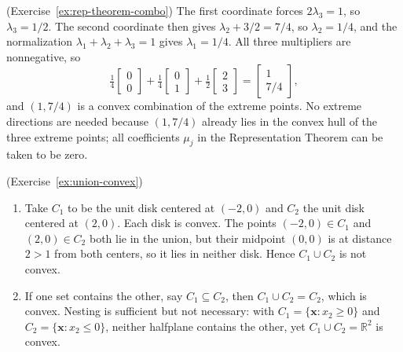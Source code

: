 \begin{solution}(Exercise~\ref{ex:rep-theorem-combo})
The first coordinate forces \( 2\lambda_3 = 1 \), so \( \lambda_3 = 1/2 \). The second coordinate then gives \( \lambda_2 + 3/2 = 7/4 \), so \( \lambda_2 = 1/4 \), and the normalization \( \lambda_1 + \lambda_2 + \lambda_3 = 1 \) gives \( \lambda_1 = 1/4 \). All three multipliers are nonnegative, so
\[
\tfrac{1}{4} \begin{bmatrix} 0 \\ 0 \end{bmatrix} + \tfrac{1}{4} \begin{bmatrix} 0 \\ 1 \end{bmatrix} + \tfrac{1}{2} \begin{bmatrix} 2 \\ 3 \end{bmatrix} = \begin{bmatrix} 1 \\ 7/4 \end{bmatrix},
\]
and \( (1, 7/4) \) is a convex combination of the extreme points. No extreme directions are needed because \( (1, 7/4) \) already lies in the convex hull of the three extreme points; all coefficients \( \mu_j \) in the Representation Theorem can be taken to be zero.
\end{solution}

\begin{solution}(Exercise~\ref{ex:union-convex})
\begin{enumerate}
    \item Take \( C_1 \) to be the unit disk centered at \( (-2,0) \) and \( C_2 \) the unit disk centered at \( (2,0) \). Each disk is convex. The points \( (-2,0) \in C_1 \) and \( (2,0) \in C_2 \) both lie in the union, but their midpoint \( (0,0) \) is at distance \( 2 > 1 \) from both centers, so it lies in neither disk. Hence \( C_1 \cup C_2 \) is not convex.
    \item If one set contains the other, say \( C_1 \subseteq C_2 \), then \( C_1 \cup C_2 = C_2 \), which is convex. Nesting is sufficient but not necessary: with \( C_1 = \{ \mathbf{x} : x_2 \geq 0 \} \) and \( C_2 = \{ \mathbf{x} : x_2 \leq 0 \} \), neither halfplane contains the other, yet \( C_1 \cup C_2 = \mathbb{R}^2 \) is convex.
\end{enumerate}
\end{solution}

